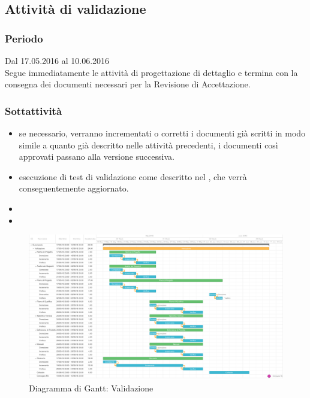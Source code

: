 \documentclass[a4paper, titlepage]{article}
\begin{document}
	\subsection{Attività di validazione}
	\subsubsection{Periodo}
	Dal 17.05.2016 al 10.06.2016\\
	Segue immediatamente le attività di progettazione di dettaglio  e termina con la consegna dei documenti necessari per la Revisione di Accettazione.
	
	\subsubsection{Sottattività}
	\begin{itemize}
		\item {} se necessario, verranno incrementati o corretti i documenti già scritti in modo simile a quanto già descritto nelle attività precedenti, i documenti così approvati passano alla versione successiva.
		\item {} esecuzione di test di validazione come descritto nel , che verrà conseguentemente aggiornato.
		\item {} 
		\item {} 
	\end{itemize}
	
	\newpage
	\begin{figure}[!ht]
		\includegraphics[scale=0.3]{Img/Grafici_Gantt/Validazione.pdf}
		\caption{ Diagramma di Gantt: Validazione}
	\end{figure}
	
\end{document}
